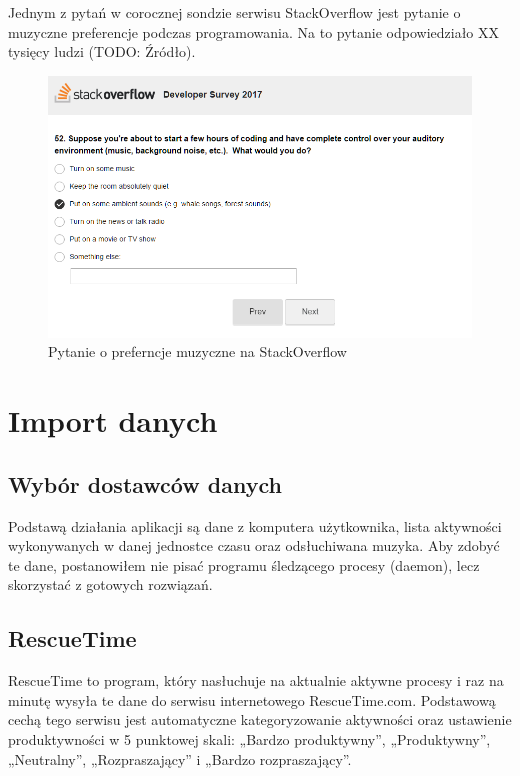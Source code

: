\documentclass[brudnopis]{xmgr}
\begin{document}
Jednym z pytań w corocznej sondzie serwisu StackOverflow jest pytanie o muzyczne preferencje podczas programowania.
Na to pytanie odpowiedziało XX tysięcy ludzi (TODO: Źródło).

\begin{figure}
  \includegraphics[width=\linewidth]{fig/stack_overflow_music.png}
  \caption{Pytanie o preferncje muzyczne na StackOverflow}
  \label{fig:Pytanie o preferncje muzyczne na StackOverflow}
\end{figure}


\chapter{Import danych}

    \section{Wybór dostawców danych}

    Podstawą działania aplikacji są dane z komputera użytkownika,
    lista aktywności wykonywanych w danej jednostce czasu oraz odsłuchiwana muzyka.
    Aby zdobyć te dane, postanowiłem nie pisać programu śledzącego procesy (daemon),
    lecz skorzystać z gotowych rozwiązań.

        \section*{RescueTime}

        RescueTime to program, który nasłuchuje na aktualnie aktywne procesy
        i raz na minutę wysyła te dane do serwisu internetowego RescueTime.com.
        Podstawową cechą tego serwisu jest automatyczne kategoryzowanie aktywności oraz ustawienie produktywności w 5 punktowej skali:
        „Bardzo produktywny”, „Produktywny”, „Neutralny”, „Rozpraszający” i „Bardzo rozpraszający”.
\end{document}
